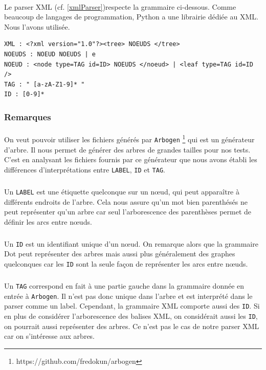 \paragraph{}Le parser XML (cf. \ref{xmlParser})respecte la grammaire ci-dessous. Comme beaucoup de langages de programmation, Python a une librairie dédiée au XML. Nous l'avons utilisée.
		
\begin{verbatim}
XML : <?xml version="1.0"?><tree> NOEUDS </tree>
NOEUDS : NOEUD NOEUDS | e
NOEUD : <node type=TAG id=ID> NOEUDS </noeud> | <leaf type=TAG id=ID />
TAG : " [a-zA-Z1-9]* "
ID : [0-9]*
\end{verbatim}

		\subsubsection*{Remarques}

\paragraph{} On veut pouvoir utiliser les fichiers générés par \verb|Arbogen| \cite{REF_Arbogen} \footnote{https://github.com/fredokun/arbogen} qui est un générateur d'arbre. Il nous permet de générer des arbres de grandes tailles pour nos tests. C'est en analysant les fichiers fournis par ce générateur que nous avons établi les différences d'interprétations entre \verb|LABEL|, \verb|ID| et \verb|TAG|.

\subparagraph{}Un \verb|LABEL| est une étiquette quelconque sur un n\oe ud, qui peut apparaître à différents endroits de l'arbre. Cela nous assure qu'un mot bien parenthésés ne peut représenter qu'un arbre car seul l'arborescence des parenthèses permet de définir les arcs entre n\oe uds.

\subparagraph{}Un \verb|ID| est un identifiant unique d'un n\oe ud. On remarque alors que la grammaire Dot peut représenter des arbres mais aussi plus généralement des graphes quelconques car les \verb|ID| sont la seule façon de représenter les arcs entre n\oe uds.

\subparagraph{}Un \verb|TAG| correspond en fait à une partie gauche dans la grammaire donnée en entrée à \verb|Arbogen|. Il n'est pas donc unique dans l'arbre et est interprété dans le parser comme un label. Cependant, la grammaire XML comporte aussi des \verb|ID|. Si en plus de considérer l'arborescence des balises XML, on considérait aussi les \verb|ID|, on pourrait aussi représenter des arbres. Ce n'est pas le cas de notre parser XML car on s'intéresse aux arbres.

